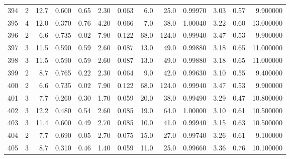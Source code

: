 \begin{tabular}{lrrrrrrrrrrrr}
394  &        2 &           12.7 &             0.600 &         0.65 &            2.30 &      0.063 &                  6.0 &                  25.0 &  0.99970 &  3.03 &       0.57 &   9.900000 \\
395  &        4 &           12.0 &             0.370 &         0.76 &            4.20 &      0.066 &                  7.0 &                  38.0 &  1.00040 &  3.22 &       0.60 &  13.000000 \\
396  &        2 &            6.6 &             0.735 &         0.02 &            7.90 &      0.122 &                 68.0 &                 124.0 &  0.99940 &  3.47 &       0.53 &   9.900000 \\
397  &        3 &           11.5 &             0.590 &         0.59 &            2.60 &      0.087 &                 13.0 &                  49.0 &  0.99880 &  3.18 &       0.65 &  11.000000 \\
398  &        3 &           11.5 &             0.590 &         0.59 &            2.60 &      0.087 &                 13.0 &                  49.0 &  0.99880 &  3.18 &       0.65 &  11.000000 \\
399  &        2 &            8.7 &             0.765 &         0.22 &            2.30 &      0.064 &                  9.0 &                  42.0 &  0.99630 &  3.10 &       0.55 &   9.400000 \\
400  &        2 &            6.6 &             0.735 &         0.02 &            7.90 &      0.122 &                 68.0 &                 124.0 &  0.99940 &  3.47 &       0.53 &   9.900000 \\
401  &        3 &            7.7 &             0.260 &         0.30 &            1.70 &      0.059 &                 20.0 &                  38.0 &  0.99490 &  3.29 &       0.47 &  10.800000 \\
402  &        3 &           12.2 &             0.480 &         0.54 &            2.60 &      0.085 &                 19.0 &                  64.0 &  1.00000 &  3.10 &       0.61 &  10.500000 \\
403  &        3 &           11.4 &             0.600 &         0.49 &            2.70 &      0.085 &                 10.0 &                  41.0 &  0.99940 &  3.15 &       0.63 &  10.500000 \\
404  &        2 &            7.7 &             0.690 &         0.05 &            2.70 &      0.075 &                 15.0 &                  27.0 &  0.99740 &  3.26 &       0.61 &   9.100000 \\
405  &        3 &            8.7 &             0.310 &         0.46 &            1.40 &      0.059 &                 11.0 &                  25.0 &  0.99660 &  3.36 &       0.76 &  10.100000 \\

\end{tabular}
